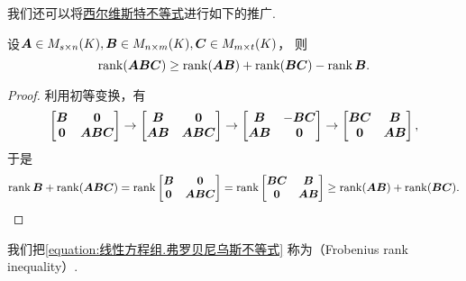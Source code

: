 我们还可以将\hyperref[equation:线性方程组.西尔维斯特不等式]{西尔维斯特不等式}进行如下的推广.
\begin{theorem}
设\(\boldsymbol{A} \in M_{s \times n}(K),
\boldsymbol{B} \in M_{n \times m}(K),
\boldsymbol{C} \in M_{m \times t}(K)\)，
则\begin{equation}\label{equation:线性方程组.弗罗贝尼乌斯不等式}
	\rank(\boldsymbol{A}\boldsymbol{B}\boldsymbol{C}) \geq \rank(\boldsymbol{A}\boldsymbol{B}) + \rank(\boldsymbol{B}\boldsymbol{C}) - \rank\boldsymbol{B}.
\end{equation}
\begin{proof}
利用初等变换，有\[
	\begin{bmatrix}
		\boldsymbol{B} & \boldsymbol0 \\
		\boldsymbol0 & \boldsymbol{A}\boldsymbol{B}\boldsymbol{C}
	\end{bmatrix}
	\to \begin{bmatrix}
		\boldsymbol{B} & \boldsymbol0 \\
		\boldsymbol{A}\boldsymbol{B} & \boldsymbol{A}\boldsymbol{B}\boldsymbol{C}
	\end{bmatrix}
	\to \begin{bmatrix}
		\boldsymbol{B} & -\boldsymbol{B}\boldsymbol{C} \\
		\boldsymbol{A}\boldsymbol{B} & \boldsymbol0
	\end{bmatrix}
	\to \begin{bmatrix}
		\boldsymbol{B}\boldsymbol{C} & \boldsymbol{B} \\
		\boldsymbol0 & \boldsymbol{A}\boldsymbol{B}
	\end{bmatrix},
\]
于是\[
	\rank\boldsymbol{B} + \rank(\boldsymbol{A}\boldsymbol{B}\boldsymbol{C})
	= \rank\begin{bmatrix}
		\boldsymbol{B} & \boldsymbol0 \\
		\boldsymbol0 & \boldsymbol{A}\boldsymbol{B}\boldsymbol{C}
	\end{bmatrix}
	= \rank\begin{bmatrix}
		\boldsymbol{B}\boldsymbol{C} & \boldsymbol{B} \\
		\boldsymbol0 & \boldsymbol{A}\boldsymbol{B}
	\end{bmatrix}
	\geq \rank(\boldsymbol{A}\boldsymbol{B}) + \rank(\boldsymbol{B}\boldsymbol{C}).
	\qedhere
\]
\end{proof}
\end{theorem}

我们把\cref{equation:线性方程组.弗罗贝尼乌斯不等式}
称为（Frobenius rank inequality）.

